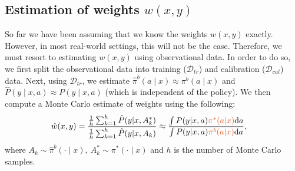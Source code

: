 \subsection{Estimation of weights $w(x, y)$}\label{sec:weights}
So far we have been assuming that we know the weights $w(x, y)$ exactly. However, in most real-world settings, this will not be the case. Therefore, we must resort to estimating $w(x, y)$ using observational data. In order to do so, we first split the observational data into training ($\mathcal{D}_{tr}$) and calibration ($\mathcal{D}_{cal}$) data. Next, using $\mathcal{D}_{tr}$, we estimate $\hat{\pi}^b(a\mid x) \approx \pi^b(a \mid x)$ and $\hat{P}(y \mid x, a) \approx P(y \mid x, a)$ (which is independent of the policy). We then compute a Monte Carlo estimate of weights using the following:
\begin{align}
    \hat{w}(x, y) &= \frac{\tfrac{1}{h}\sum_{k=1}^{h} \hat{P}(y|x, A^*_k)}{\tfrac{1}{h} \sum_{k=1}^{h} \hat{P}(y|x, A_k)} \approx \frac{\int P(y|x, a) \textcolor{red}{\pi^*(a|x)} \mathrm{d}a}{\int P(y| x, a) \textcolor{red}{\pi^b(a|x)} \mathrm{d}a},  \label{weight-est}
\end{align}
where $A_k\sim \hat{\pi}^b(\cdot \mid x),~ A_k^* \sim  \pi^*(\cdot \mid x)$ and $h$ is the number of Monte Carlo samples.

